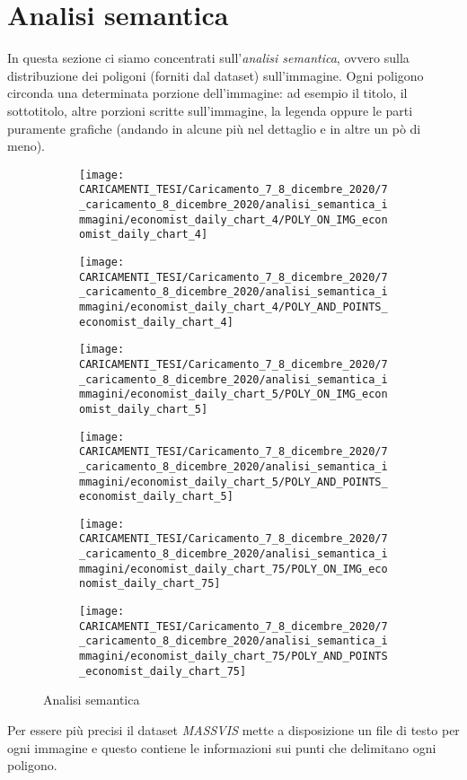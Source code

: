 \documentclass[%
	corpo=12pt,
    twoside,
    stile=classica,
    oldstyle,
    tipotesi=custom,
    greek,
    evenboxes,
]{toptesi}
\begin{document}
{\section{Analisi semantica}
In questa sezione ci siamo concentrati sull'\textit{analisi semantica}, ovvero sulla distribuzione dei poligoni (forniti dal dataset) sull'immagine. Ogni poligono circonda una determinata porzione dell'immagine: ad esempio il titolo, il sottotitolo, altre porzioni scritte sull'immagine, la legenda oppure le parti puramente grafiche (andando in alcune più nel dettaglio e in altre un pò di meno). 
\begin{figure}[!htb]\centering
\begin{subfigure}
\centering
\texttt{[image: CARICAMENTI\_TESI/Caricamento\_7\_8\_dicembre\_2020/7\_caricamento\_8\_dicembre\_2020/analisi\_semantica\_immagini/economist\_daily\_chart\_4/POLY\_ON\_IMG\_economist\_daily\_chart\_4]}
\end{subfigure}
\begin{subfigure}
\centering
\texttt{[image: CARICAMENTI\_TESI/Caricamento\_7\_8\_dicembre\_2020/7\_caricamento\_8\_dicembre\_2020/analisi\_semantica\_immagini/economist\_daily\_chart\_4/POLY\_AND\_POINTS\_economist\_daily\_chart\_4]}
\end{subfigure}
\begin{subfigure}
\centering
\texttt{[image: CARICAMENTI\_TESI/Caricamento\_7\_8\_dicembre\_2020/7\_caricamento\_8\_dicembre\_2020/analisi\_semantica\_immagini/economist\_daily\_chart\_5/POLY\_ON\_IMG\_economist\_daily\_chart\_5]}
\end{subfigure}
\begin{subfigure}
\centering
\texttt{[image: CARICAMENTI\_TESI/Caricamento\_7\_8\_dicembre\_2020/7\_caricamento\_8\_dicembre\_2020/analisi\_semantica\_immagini/economist\_daily\_chart\_5/POLY\_AND\_POINTS\_economist\_daily\_chart\_5]}
\end{subfigure}
\begin{subfigure}
\centering
\texttt{[image: CARICAMENTI\_TESI/Caricamento\_7\_8\_dicembre\_2020/7\_caricamento\_8\_dicembre\_2020/analisi\_semantica\_immagini/economist\_daily\_chart\_75/POLY\_ON\_IMG\_economist\_daily\_chart\_75]}
\end{subfigure}
\begin{subfigure}
\centering
\texttt{[image: CARICAMENTI\_TESI/Caricamento\_7\_8\_dicembre\_2020/7\_caricamento\_8\_dicembre\_2020/analisi\_semantica\_immagini/economist\_daily\_chart\_75/POLY\_AND\_POINTS\_economist\_daily\_chart\_75]}
\end{subfigure}
\caption{Analisi semantica}\label{fig: POLY_ON_IMG_economist_daily_chart_4}
\end{figure}
Per essere più precisi il dataset \textit{MASSVIS} mette a disposizione un file di testo per ogni immagine e questo contiene le informazioni sui punti che delimitano ogni poligono. 


}
\end{document}
